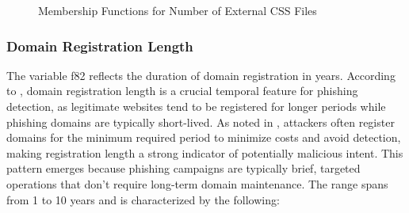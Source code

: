 \documentclass{article}
\begin{document}
\begin{figure}[H]
\centering
{}
\caption{Membership Functions for Number of External CSS Files}
\label{fig:membership_css_files}
\end{figure}
    
\subsubsection{Domain Registration Length}

The variable f82 reflects the duration of domain registration in years. According to \cite{8036198}, domain registration length is a crucial temporal feature for phishing detection, as legitimate websites tend to be registered for longer periods while phishing domains are typically short-lived. As noted in \cite{10049452}, attackers often register domains for the minimum required period to minimize costs and avoid detection, making registration length a strong indicator of potentially malicious intent. This pattern emerges because phishing campaigns are typically brief, targeted operations that don't require long-term domain maintenance. The range spans from 1 to 10 years and is characterized by the following:
\end{document}
